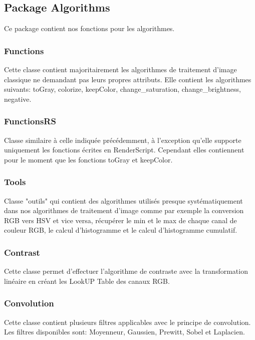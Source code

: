 \documentclass{article}
\begin{document}
\subsection{Package Algorithms}
Ce package contient nos fonctions pour les algorithmes.
\subsubsection{Functions}
\medbreak

Cette classe contient majoritairement les algorithmes de traitement d'image classique ne demandant pas leurs propres attributs. Elle contient les algorithmes suivants: toGray, colorize, keepColor, change\_saturation, change\_brightness, negative.
\medbreak

\subsubsection{FunctionsRS}
\medbreak

Classe similaire à celle indiquée précédemment, à l'exception qu'elle supporte uniquement les fonctions écrites en RenderScript. Cependant elles contiennent pour le moment que les fonctions toGray et keepColor.
\medbreak

\subsubsection{Tools}
\medbreak

Classe "outils" qui contient des algorithmes utilisés presque systématiquement dans nos algorithmes de traitement d'image comme par exemple la conversion RGB vers HSV et vice versa, récupérer le min et le max de chaque canal de couleur RGB, le calcul d'histogramme et le calcul d'histogramme cumulatif.
\medbreak

\subsubsection{Contrast}
\medbreak

Cette classe permet d'effectuer l'algorithme de contraste avec la transformation linéaire en créant les LookUP Table des canaux RGB.
\medbreak

\subsubsection{Convolution}
\medbreak

Cette classe contient plusieurs filtres applicables avec le principe de convolution. Les filtres disponibles sont: Moyenneur, Gaussien, Prewitt, Sobel et Laplacien.
\medbreak
\end{document}
